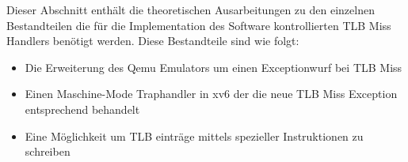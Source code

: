 Dieser Abschnitt enthält die theoretischen Ausarbeitungen zu den einzelnen Bestandteilen die für
die Implementation des Software kontrollierten TLB Miss Handlers benötigt werden. Diese Bestandteile
sind wie folgt:
\begin{itemize}
    \item Die Erweiterung des Qemu Emulators um einen Exceptionwurf bei TLB Miss
    \item Einen Maschine-Mode Traphandler in xv6 der die neue TLB Miss Exception entsprechend behandelt
    \item Eine Möglichkeit um TLB einträge mittels spezieller Instruktionen zu schreiben
\end{itemize}








